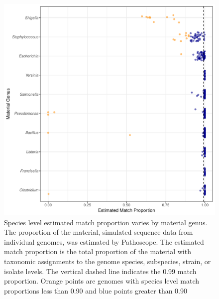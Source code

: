 \documentclass[fleqn,10pt,lineno]{wlpeerj}\usepackage[]{graphicx}\usepackage[]{color}
\makeatletter
\def\maxwidth{ %
  \ifdim\Gin@nat@width>\linewidth
    \linewidth
  \else
    \Gin@nat@width
  \fi
}
\newenvironment{knitrout}{}{} %
\makeatother
\begin{document}
\begin{knitrout}
\color{fgcolor}\begin{figure}
\includegraphics[width=\maxwidth]{figure/species_prop-1.pdf} \caption[Species level estimated match proportion varies by material genus]{Species level estimated match proportion varies by material genus. The proportion of the material, simulated sequence data from individual genomes, was estimated by Pathoscope. The estimated match proportion is the total proportion of the material with taxonomic assignments to the genome species, subspecies, strain, or isolate levels. The vertical dashed line indicates the 0.99 match proportion. Orange points are genomes with species level match proportions less than 0.90 and blue points greater than 0.90}\label{fig:species_prop}
\end{figure}


\end{knitrout}
\end{document}
